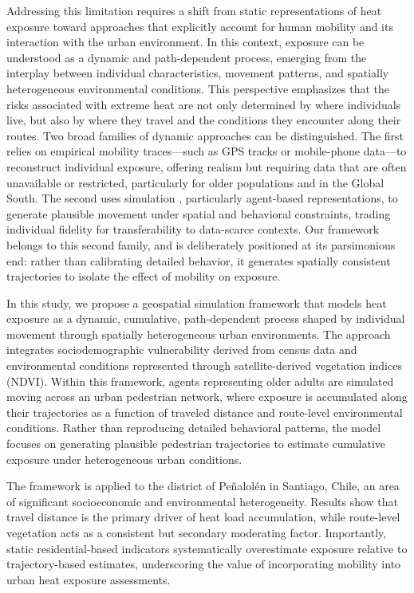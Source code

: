 \documentclass{wscpaperproc}
\theoremstyle{wsc}
\begin{document}
Addressing this limitation requires a shift from static representations of heat exposure toward approaches that explicitly account for human mobility and its interaction with the urban environment. In this context, exposure can be understood as a dynamic and path-dependent process, emerging from the interplay between individual characteristics, movement patterns, and spatially heterogeneous environmental conditions. This perspective emphasizes that the risks associated with extreme heat are not only determined by where individuals live, but also by where they travel and the conditions they encounter along their routes. Two broad families of dynamic approaches can be distinguished. The first relies on empirical mobility traces—such as GPS tracks or mobile-phone data—to reconstruct individual exposure, offering realism but requiring data that are often unavailable or restricted, particularly for older populations and in the Global South. The second uses simulation \cite{batty2005cities} \cite{miller2007complex}, particularly agent-based representations, to generate plausible movement under spatial and behavioral constraints, trading individual fidelity for transferability to data-scarce contexts. Our framework belongs to this second family, and is deliberately positioned at its parsimonious end: rather than calibrating detailed behavior, it generates spatially consistent trajectories to isolate the effect of mobility on exposure. %

In this study, we propose a geospatial simulation framework that models heat exposure as a dynamic,  cumulative, path-dependent process shaped by individual movement through spatially heterogeneous urban environments. The approach integrates sociodemographic vulnerability derived from census data and environmental conditions represented through satellite-derived vegetation indices (NDVI). Within this framework, agents representing older adults are simulated moving across an urban pedestrian network, where exposure is accumulated along their trajectories as a function of traveled distance and route-level environmental conditions. Rather than reproducing detailed behavioral patterns, the model focuses on generating plausible pedestrian trajectories to estimate cumulative exposure under heterogeneous urban conditions.

The framework is applied to the district of Peñalolén in Santiago, Chile, an area of significant socioeconomic and environmental heterogeneity. Results show that travel distance is the primary driver of heat load accumulation, while route-level vegetation acts as a consistent but secondary moderating factor. Importantly, static residential-based indicators systematically overestimate exposure relative to trajectory-based estimates, underscoring the value of incorporating mobility into urban heat exposure assessments.
\end{document}
